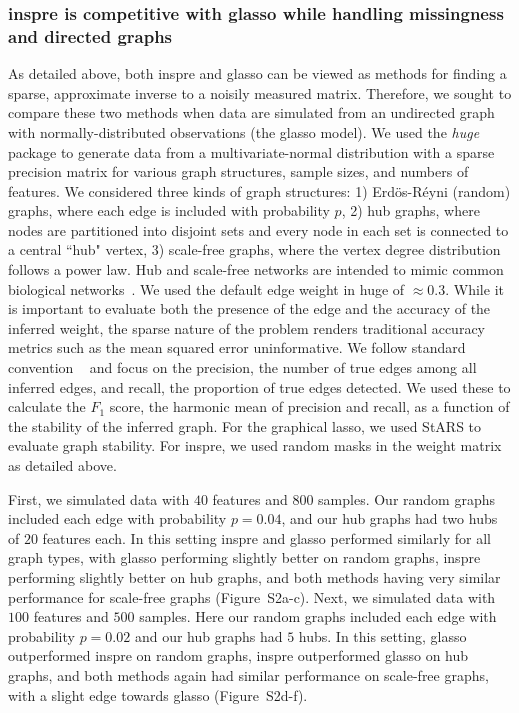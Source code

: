 \documentclass{article}
\begin{document}
\subsubsection*{inspre is competitive with glasso while handling missingness and directed graphs}
As detailed above, both inspre and glasso can be viewed as methods
for finding a sparse, approximate inverse to a noisily measured matrix.
Therefore, we sought to compare these two methods when data are simulated
from an undirected graph with normally-distributed observations (the glasso model). We used the \emph{huge}~\cite{Zhao2012} package to generate data
from a multivariate-normal distribution with a sparse precision matrix
for various graph structures, sample sizes, and numbers of features.
We considered three kinds of graph structures: 1) Erd\"os-R\'eyni (random) graphs,
where each edge is included with probability $p$, 2) hub graphs, where nodes
are partitioned into
disjoint sets and every node in each set is connected to a central ``hub" vertex,
3) scale-free graphs, where the vertex degree distribution
follows a power law. Hub and scale-free networks are intended to mimic common
biological networks~\cite{Barabasi1999}.
We used the default edge weight in huge of $\approx 0.3$.
While it is important to evaluate both the presence of the edge and the accuracy of the inferred weight,
the sparse nature of the problem renders traditional accuracy metrics such as
the mean squared error uninformative. We follow standard convention
~\cite{Friedman2007, Liu2010, Zhao2012} and focus on the precision,
the number of true edges among all inferred edges, and recall, the proportion
of true edges detected. We used these to calculate the $F_1$ score, the
harmonic mean of precision and recall, as a function of the
stability of the inferred graph. For the graphical lasso, we used StARS to
evaluate graph stability. For inspre, we used random masks in the weight matrix
as detailed above.

First, we simulated data with $40$ features and $800$ samples. Our random
graphs included each edge with probability $p=0.04$, and our hub graphs had
two hubs of $20$ features each. In this setting inspre and glasso performed
similarly for all graph types, with glasso performing slightly better on
random graphs, inspre performing slightly better on hub graphs, and 
both methods having very similar performance for scale-free graphs
(Figure~S2a-c). Next, we simulated  data with $100$
features and $500$ samples. Here our random graphs included each edge with
probability $p=0.02$ and our hub graphs had $5$ hubs. In this setting, glasso outperformed inspre on
random graphs, inspre outperformed glasso on hub graphs, and both methods again
had similar performance on scale-free graphs, with a slight edge towards
glasso (Figure~S2d-f).
\end{document}
